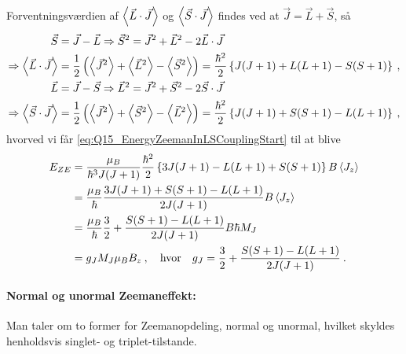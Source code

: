 Forventningsværdien af $\Braket{\Vec{L} \cdot \Vec{J}}$ og $\Braket{\Vec{S} \cdot \Vec{J}}$ findes ved at $\Vec{J} = \Vec{L} + \Vec{S}$, så
\begin{align}
    \Vec{S} &= \Vec{J} - \Vec{L} \Rightarrow \Vec{S}^2 = \Vec{J}^2 + \Vec{L}^2 - 2\Vec{L} \cdot \Vec{J} \nonumber\\
    \Rightarrow \Braket{\Vec{L} \cdot \Vec{J}} &= \frac{1}{2} \left(\Braket{\Vec{J}^2} + \Braket{\Vec{L}^2} - \Braket{\Vec{S}^2}\right) = \frac{\hbar^2}{2} \left\{J(J+1) + L(L+1) - S(S+1)\right\} \: , \\
    \Vec{L} &= \Vec{J} - \Vec{S} \Rightarrow \Vec{L}^2 = \Vec{J}^2 + \Vec{S}^2 - 2\Vec{S} \cdot \Vec{J} \nonumber\\
    \Rightarrow \Braket{\Vec{S} \cdot \Vec{J}} &= \frac{1}{2} \left(\Braket{\Vec{J}^2} + \Braket{\Vec{S}^2} - \Braket{\Vec{L}^2}\right) = \frac{\hbar^2}{2} \left\{J(J+1) + S(S+1) - L(L+1)\right\} \: ,
\end{align}
hvorved vi får \cref{eq:Q15_EnergyZeemanInLSCouplingStart} til at blive
\begin{align}
    E_{ZE} &= \frac{\mu_B}{\hbar^3 J(J+1)} \frac{\hbar^2}{2}\left\{3J(J+1) - L(L+1) + S(S+1)\right\} B \Braket{J_z} \nonumber\\
    &= \frac{\mu_B}{\hbar} \frac{3J(J+1) + S(S+1) - L(L+1)}{2J(J+1)} B \Braket{J_z} \nonumber\\
    &= \frac{\mu_B}{\hbar} \frac{3}{2} + \frac{S(S+1) - L(L+1)}{2J(J+1)} B \hbar M_J \nonumber\\
    &= g_J M_J \mu_B B_z \: , \quad \text{hvor} \quad g_J = \frac{3}{2} + \frac{S(S+1) - L(L+1)}{2J(J+1)} \: .
\end{align}



\paragraph{Normal og unormal Zeemaneffekt:} Man taler om to former for Zeemanopdeling, normal og unormal, hvilket skyldes henholdsvis singlet- og triplet-tilstande.

